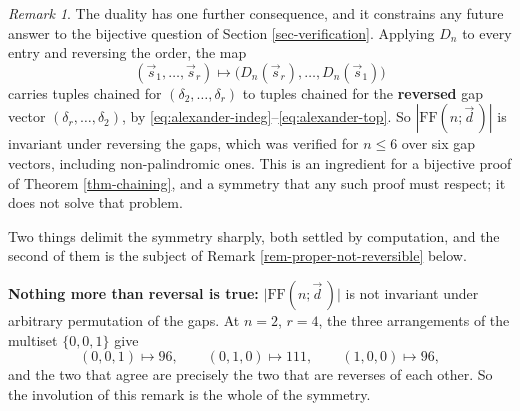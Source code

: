 \documentclass[11pt, a4paper, abstract=yes]{scrartcl}
\theoremstyle{definition}
\theoremstyle{remark}
\newtheorem{remark}[definition]{Remark}
\theoremstyle{plain}
\begin{document}
\begin{remark}
The duality has one further consequence, and it constrains any future answer to the bijective
question of Section \ref{sec-verification}. Applying \(D_n\) to every entry and reversing the order, the map
\begin{equation}\label{eq:gap-reversal-map}
  (\vec s_1,\dots,\vec s_r)\longmapsto\bigl(D_n(\vec s_r),\dots,D_n(\vec s_1)\bigr)
\end{equation}
carries tuples chained for \((\delta_2,\dots,\delta_r)\) to tuples chained for the \textbf{reversed} gap
vector \((\delta_r,\dots,\delta_2)\), by \eqref{eq:alexander-indeg}--\eqref{eq:alexander-top}. So
\(|\mathrm{FF}(n;\vec d\,)|\) is
invariant under reversing the gaps, which was verified for \(n\le6\) over six gap vectors,
including non-palindromic ones. This is an ingredient for a bijective proof of
Theorem \ref{thm-chaining}, and a symmetry that any such proof must respect; it does not solve that
problem.

Two things delimit the symmetry sharply, both settled by computation, and the second of them is the
subject of Remark \ref{rem-proper-not-reversible} below.

\textbf{Nothing more than reversal is true:} \(\lvert\mathrm{FF}(n;\vec d\,)\rvert\) is not invariant under arbitrary
permutation of the gaps. At \(n=2\), \(r=4\), the three arrangements of the multiset
\(\lbrace0,0,1\rbrace\) give
\begin{equation}\label{eq:no-permutation-invariance}
  (0,0,1)\mapsto96,\qquad (0,1,0)\mapsto111,\qquad (1,0,0)\mapsto96 ,
\end{equation}
and the two that agree are precisely the two that are reverses of each other. So the involution of
this remark is the whole of the symmetry.
\label{rem-gap-reversal}
\end{remark}
\end{document}
